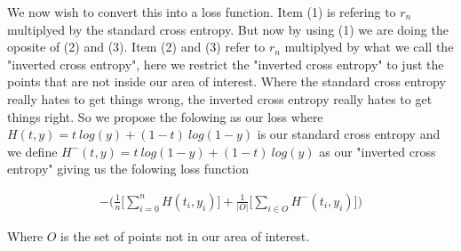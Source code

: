 \documentclass{article}
\begin{document}
We now wish to convert this into a loss function. Item (1) is refering to $r_n$ multiplyed by the standard cross entropy. But now by using (1) we are doing the oposite of (2) and (3). Item (2) and (3) refer to $r_n$ multiplyed by what we call the "inverted cross entropy", here we restrict the "inverted cross entropy" to just the points that are not inside our area of interest. Where the standard cross entropy really hates to get things wrong, the inverted cross entropy really hates to get things right. So we propose the folowing as our loss where $H(t, y) = t\ log(y) + (1-t)\ log(1-y)$ is our standard cross entropy and we define $H^-(t, y) = t\ log(1-y) + (1-t)\ log(y)$ as our "inverted cross entropy" giving us the folowing loss function

\begin{align}
- \big( \frac{1}{n} \big[ \sum_{i=0}^n H(t_i, y_i) \big] + \frac{1}{|O|} \big[ \sum_{i \in O} H^{-}(t_i, y_i) \big] \big)
\end{align}

Where $O$ is the set of points not in our area of interest.
\end{document}
